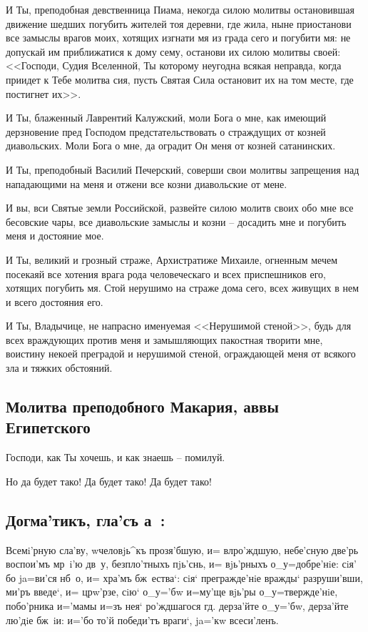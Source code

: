 \documentclass[12pt,twoside,xdvi,a6paper,civil=times]{hipbook}
\renewcommand{\*}{\raise3pt\hbox{\footnotesize*}}
\begin{document}
И Ты, преподобная девственница Пиама, некогда силою молитвы остановившая
движение шедших погубить жителей тоя деревни, где жила, ныне приостанови все
замыслы врагов моих, хотящих изгнати мя из града сего и погубити мя: не
допускай им приближатися к дому сему, останови их силою молитвы своей:
<<Господи, Судия Вселенной, Ты которому неугодна всякая неправда, когда приидет
к Тебе молитва сия, пусть Святая Сила остановит их на том месте, где постигнет
их>>.

И Ты, блаженный Лаврентий Калужский, моли Бога о мне, как имеющий дерзновение
пред Господом предстательствовать о страждущих от козней диавольских. Моли
Бога о мне, да оградит Он меня от козней сатанинских.

И Ты, преподобный Василий Печерский, соверши свои молитвы запрещения над
нападающими на меня и отжени все козни диавольские от мене.

И вы, вси Святые земли Российской, развейте силою молитв своих обо мне все
бесовские чары, все диавольские замыслы и козни -- досадить мне и погубить меня
и достояние мое.

И Ты, великий и грозный страже, Архистратиже Михаиле, огненным мечем посекаяй
все хотения врага рода человеческаго и всех приспешников его, хотящих погубить
мя. Стой нерушимо на страже дома сего, всех живущих в нем и всего достояния
его.

И Ты, Владычице, не напрасно именуемая <<Нерушимой стеной>>, будь для всех
враждующих против меня и замышляющих пакостная творити мне, воистину некоей
преградой и нерушимой стеной, ограждающей меня от всякого зла и тяжких
обстояний.

\subsection{\bfseries Молитва преподобного Макария, аввы Египетского}

Господи, как Ты хочешь, и как знаешь -- помилуй.

Но да будет тако! Да будет тако! Да будет тако!

\cs
\subsection{Догма'тикъ, гла'съ а~:}

Всемi'рную сла'ву, w\т человjь^къ прозя'бшую, и= вл ро'ждшую, небе'сную
две'рь воспои'мъ мр~i'ю дв~у, безпло'тныхъ пjь'снь, и= вjь'рныхъ
о_у=добре'нiе: сiя' бо ja=ви'ся нб~о, и= хра'мъ бж~е\-ства`: сiя` прегражде'нiе
вражды` разруши'вши, ми'ръ введе`, и= цр w'рзе, сiю` о_у='бw и=му'\-ще
вjь'ры о_у=твержде'нiе, побо'рника и='мамы и=зъ нея` ро'ждшагося гд.
дер\-за'й\-те о_у='бw, дер\-за'й\-те лю'дiе бж~iи: и='бо то'й победи'тъ вра\-ги`, ja='кw
всеси'ленъ.
\end{document}
